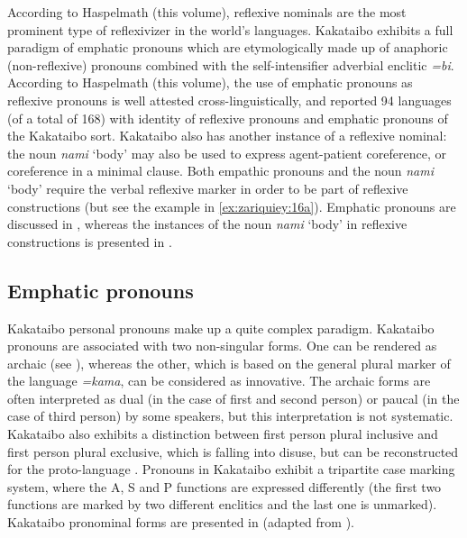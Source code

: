\documentclass[output=paper,colorlinks,citecolor=brown,modfonts,nonflat]{langscibook}
\begin{document}
According to Haspelmath (this volume), reflexive nominals are the most prominent type of reflexivizer in the world’s languages. Kakataibo exhibits a full paradigm of emphatic pronouns which are etymologically made up of anaphoric (non-reflexive) pronouns combined with the self-intensifier adverbial enclitic \textit{=bi}. According to Haspelmath (this volume), the use of emphatic pronouns as reflexive pronouns is well attested cross-linguistically, and \citet{KönigEtAl2005} reported 94 languages (of a total of 168) with identity of reflexive pronouns and emphatic pronouns of the Kakataibo sort. Kakataibo also has another instance of a reflexive nominal: the noun \textit{nami} ‘body’ may also be used to express agent-patient coreference, or coreference in a minimal clause. Both empathic pronouns and the noun \textit{nami} ‘body’ require the verbal reflexive marker in order to be part of reflexive constructions (but see the example in \ref{ex:zariquiey:16a}). Emphatic pronouns are discussed in , whereas the instances of the noun \textit{nami} ‘body’ in reflexive constructions is presented in .

\subsection{Emphatic pronouns}\label{sec:zariquiey:4.1}

Kakataibo personal pronouns make up a quite complex paradigm. Kakataibo pronouns are associated with two non-singular forms. One can be rendered as archaic (see \citealt{Zariquiey2006}), whereas the other, which is based on the general plural marker of the language \textit{=kama}, can be considered as innovative. The archaic forms are often interpreted as dual (in the case of first and second person) or paucal (in the case of third person) by some speakers, but this interpretation is not systematic. Kakataibo also exhibits a distinction between first person plural inclusive and first person plural exclusive, which is falling into disuse, but can be reconstructed for the proto-language \citep{Zariquiey2006}. Pronouns in Kakataibo exhibit a tripartite case marking system, where the A, S and P functions are expressed differently (the first two functions are marked by two different enclitics and the last one is unmarked). Kakataibo pronominal forms are presented in  (adapted from \citealt[177]{Zariquiey2018}). 
\end{document}

